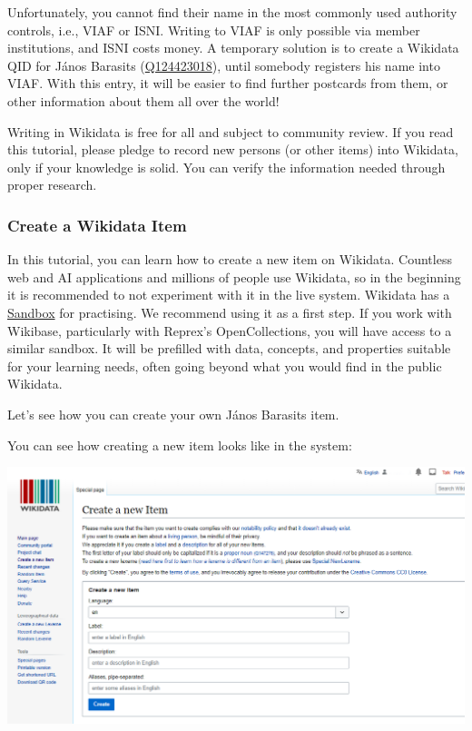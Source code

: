 \documentclass[
  letterpaper,
  DIV=11,
  numbers=noendperiod]{scrreprt}
\begin{document}
Unfortunately, you cannot find their name in the most commonly used
authority controls, i.e., VIAF or ISNI. Writing to VIAF is only possible
via member institutions, and ISNI costs money. A temporary solution is
to create a Wikidata QID for János Barasits
(\href{https://www.wikidata.org/wiki/Q124423018}{Q124423018}), until
somebody registers his name into VIAF. With this entry, it will be
easier to find further postcards from them, or other information about
them all over the world!

Writing in Wikidata is free for all and subject to community review. If
you read this tutorial, please pledge to record new persons (or other
items) into Wikidata, only if your knowledge is solid. You can verify
the information needed through proper research.

\subsubsection{Create a Wikidata Item}\label{create-a-wikidata-item}

In this tutorial, you can learn how to create a new item on Wikidata.
Countless web and AI applications and millions of people use Wikidata,
so in the beginning it is recommended to not experiment with it in the
live system. Wikidata has a
\href{https://www.wikidata.org/wiki/Wikidata:Sandbox}{Sandbox} for
practising. We recommend using it as a first step. If you work with
Wikibase, particularly with Reprex's OpenCollections, you will have
access to a similar sandbox. It will be prefilled with data, concepts,
and properties suitable for your learning needs, often going beyond what
you would find in the public Wikidata.

Let's see how you can create your own János Barasits item.

You can see how creating a new item looks like in the system:

\begin{center}
\includegraphics{png/wikidata-tutorial/wikidata-create-new-item-20240204.png}
\end{center}
\end{document}
